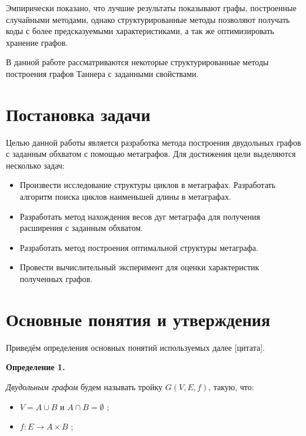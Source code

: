 \documentclass[14pt]{mmcs-article}
\begin{document}
Эмпирически показано, что лучшие результаты показывают графы, построенные случайными методами, однако структурированные методы позволяют получать коды с более предсказуемыми характеристиками, а так же оптимизировать хранение графов. 

В данной работе рассматриваются некоторые структурированные методы построения графов Таннера с заданными свойствами.

\newpage
{}

\section*{Постановка задачи}


Целью данной работы является разработка метода построения двудольных графов с заданным обхватом с помощью метаграфов. Для достижения цели выделяются несколько задач:

\begin{itemize}
  \item Произвести исследование структуры циклов в метаграфах. Разработать алгоритм поиска циклов наименьшей длины в метаграфах.
  \item Разработать метод нахождения весов дуг метаграфа для получения расширения с заданным обхватом.
  \item Разработать метод построения оптимальной структуры метаграфа.
  \item Провести вычислительный эксперимент для оценки характеристик полученных графов.
\end{itemize}

\newpage
\section{Основные понятия и утверждения}

Приведём определения основных понятий используемых далее [цитата].

\textbf{Определение 1.}


\textsl{Двудольным графом} будем называть тройку $ G(V, E, f)$, такую, что:

\begin{itemize}
    \item $V = A \cup B$ и $A \cap B = \emptyset$ ;
    \item $f: E \rightarrow A \times B$ ;
\end{itemize}
\end{document}
